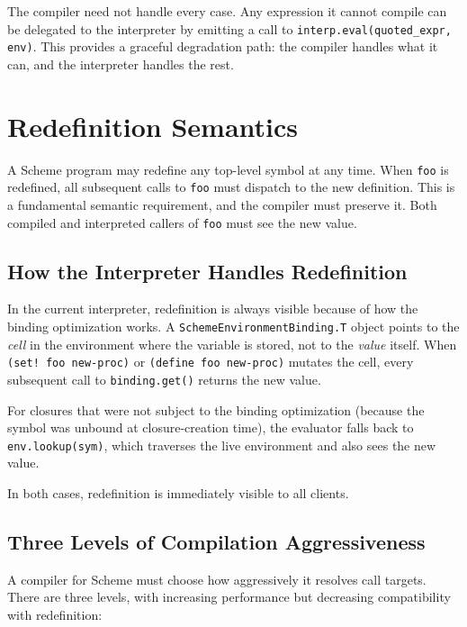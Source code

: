 \documentclass[12pt]{report}
\begin{document}
The compiler need not handle every case.  Any expression it cannot
compile can be delegated to the interpreter by emitting a call to
\texttt{interp.eval(quoted\_expr, env)}.  This provides a graceful
degradation path: the compiler handles what it can, and the
interpreter handles the rest.

\chapter{Redefinition Semantics}
\label{ch:redef}

A Scheme program may redefine any top-level symbol at any time.
When \texttt{foo} is redefined, all subsequent calls to \texttt{foo}
must dispatch to the new definition.  This is a fundamental semantic
requirement, and the compiler must preserve it.  Both compiled and
interpreted callers of \texttt{foo} must see the new value.

\section{How the Interpreter Handles Redefinition}

In the current interpreter, redefinition is always visible because
of how the binding optimization works.  A
\texttt{SchemeEnvironmentBinding.T} object points to the
\emph{cell} in the environment where the variable is stored, not
to the \emph{value} itself.  When \texttt{(set!\ foo new-proc)} or
\texttt{(define foo new-proc)} mutates the cell, every subsequent
call to \texttt{binding.get()} returns the new value.

For closures that were not subject to the binding optimization
(because the symbol was unbound at closure-creation time), the
evaluator falls back to \texttt{env.lookup(sym)}, which traverses
the live environment and also sees the new value.

In both cases, redefinition is immediately visible to all clients.

\section{Three Levels of Compilation Aggressiveness}
\label{sec:redefinition}

A compiler for Scheme must choose how aggressively it resolves
call targets.  There are three levels, with increasing performance
but decreasing compatibility with redefinition:
\end{document}
